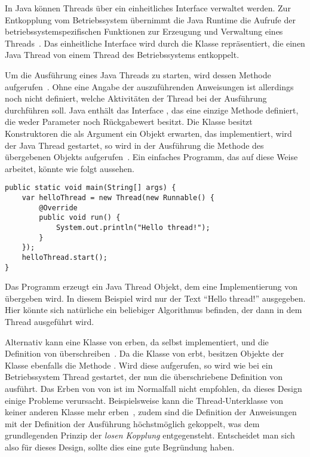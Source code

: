 In Java können Threads über ein einheitliches Interface verwaltet werden. Zur Entkopplung vom Betriebssystem übernimmt die Java Runtime die Aufrufe der betriebssystemspezifischen Funktionen zur Erzeugung und Verwaltung eines Threads~\cite[S.~3]{Friesen2015}. Das einheitliche Interface wird durch die Klasse  repräsentiert, die einen Java Thread von einem Thread des  Betriebssystems entkoppelt. 

Um die Ausführung eines Java Threads zu starten, wird dessen Methode  aufgerufen~\cite[S.~8]{Friesen2015}. Ohne eine Angabe der auszuführenden Anweisungen ist allerdings noch nicht definiert, welche Aktivitäten der Thread bei der Ausführung durchführen soll. Java enthält das Interface , das eine einzige Methode  definiert, die weder Parameter noch Rückgabewert besitzt. Die Klasse  besitzt Konstruktoren die als Argument ein Objekt erwarten, das  implementiert, wird der Java Thread gestartet, so wird in der Ausführung die  Methode des übergebenen Objekts aufgerufen~\cite[S.~3]{Friesen2015}. Ein einfaches Programm, das auf diese Weise arbeitet, könnte wie folgt aussehen.
\begin{lstlisting}
public static void main(String[] args) {
	var helloThread = new Thread(new Runnable() {
		@Override
		public void run() {
			System.out.println("Hello thread!");
		}
	});
	helloThread.start();
}
\end{lstlisting}
Das Programm erzeugt ein Java Thread Objekt, dem eine Implementierung von  übergeben wird. In diesem Beispiel wird nur der Text \enquote{Hello thread!} ausgegeben. Hier könnte sich natürliche ein beliebiger Algorithmus befinden, der dann in dem Thread ausgeführt wird.

Alternativ kann eine Klasse von  erben, da  selbst  implementiert, und die Definition von  überschreiben~\cite[S.~335]{Rauber2006}. Da die Klasse von  erbt, besitzen Objekte der Klasse ebenfalls die Methode . Wird diese aufgerufen, so wird wie bei  ein Betriebssystem Thread gestartet, der nun die überschriebene Definition von  ausführt. Das Erben von von  ist im Normalfall nicht empfohlen, da dieses Design einige Probleme verursacht. Beispielsweise kann die Thread-Unterklasse von keiner anderen Klasse mehr erben~\cite[S.~335]{Rauber2006}, zudem sind die Definition der Anweisungen mit der Definition der Ausführung höchstmöglich gekoppelt, was dem grundlegenden Prinzip der \emph{losen Kopplung} entgegensteht. Entscheidet man sich also für dieses Design, sollte dies eine gute Begründung haben.

